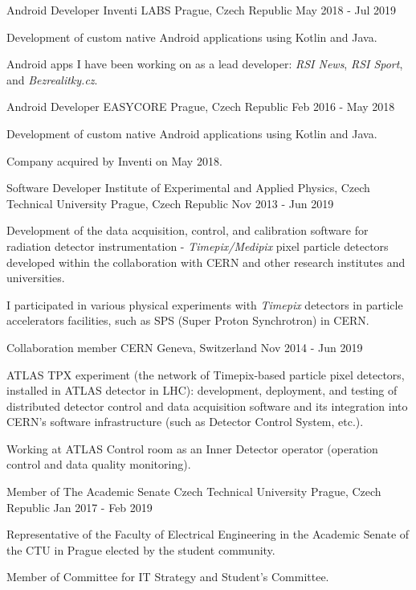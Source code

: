 \begin{cventries}
  \cventry
    {Android Developer}
    {Inventi LABS}
    {Prague, Czech Republic}
    {May 2018 - Jul 2019}
    {
      \begin{cvitems}
        \item {Development of custom native Android applications using Kotlin and Java.}
        \item {Android apps I have been working on as a lead developer: \textit{RSI News}, \textit{RSI Sport}, and \textit{Bezrealitky.cz}.}
      \end{cvitems}
    }
  \cventry
    {Android Developer}
    {EASYCORE}
    {Prague, Czech Republic}
    {Feb 2016 - May 2018}
    {
      \begin{cvitems}
        \item {Development of custom native Android applications using Kotlin and Java.}
        \item {Company acquired by Inventi on May 2018.}
      \end{cvitems}
    }
  \cventry
    {Software Developer}
    {Institute of Experimental and Applied Physics, Czech Technical University}
    {Prague, Czech Republic}
    {Nov 2013 - Jun 2019}
    {
      \begin{cvitems}
      \item {Development of the data acquisition, control, and calibration software for radiation detector instrumentation - \textit{Timepix/Medipix} pixel particle detectors developed within the collaboration with CERN and other research institutes and universities.}
      \item {I participated in various physical experiments with \textit{Timepix} detectors in particle accelerators facilities, such as SPS (Super Proton Synchrotron) in CERN.}
      \end{cvitems}
    }
  \cventry
    {Collaboration member}
    {CERN}
    {Geneva, Switzerland}
    {Nov 2014 - Jun 2019}
    {
      \begin{cvitems}
      \item {ATLAS TPX experiment (the network of Timepix-based particle pixel detectors, installed in ATLAS detector in LHC): development, deployment, and testing of distributed detector control and data acquisition software and its integration into CERN's software infrastructure (such as Detector Control System, etc.).}
      \item{Working at ATLAS Control room as an Inner Detector operator (operation control and data quality monitoring).}
      \end{cvitems}
    }
  \cventry
    {Member of The Academic Senate}
    {Czech Technical University}
    {Prague, Czech Republic}
    {Jan 2017 - Feb 2019}
    {
      \begin{cvitems}
      \item {Representative of the Faculty of Electrical Engineering in the Academic Senate of the CTU in Prague elected by the student community.}
      \item {Member of Committee for IT Strategy and Student's Committee.}
      \end{cvitems}
    }
    
\end{cventries}
